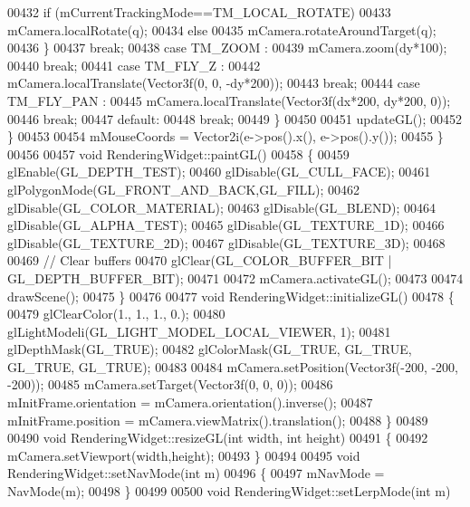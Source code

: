 \begin{DoxyCode}
00432               \textcolor{keywordflow}{if} (mCurrentTrackingMode==TM\_LOCAL\_ROTATE)
00433                 mCamera.localRotate(q);
00434               \textcolor{keywordflow}{else}
00435                 mCamera.rotateAroundTarget(q);
00436             \}
00437             \textcolor{keywordflow}{break};
00438           \textcolor{keywordflow}{case} TM\_ZOOM :
00439             mCamera.zoom(dy*100);
00440             \textcolor{keywordflow}{break};
00441           \textcolor{keywordflow}{case} TM\_FLY\_Z :
00442             mCamera.localTranslate(Vector3f(0, 0, -dy*200));
00443             \textcolor{keywordflow}{break};
00444           \textcolor{keywordflow}{case} TM\_FLY\_PAN :
00445             mCamera.localTranslate(Vector3f(dx*200, dy*200, 0));
00446             \textcolor{keywordflow}{break};
00447           \textcolor{keywordflow}{default}:
00448             \textcolor{keywordflow}{break};
00449         \}
00450 
00451         updateGL();
00452     \}
00453 
00454     mMouseCoords = Vector2i(e->pos().x(), e->pos().y());
00455 \}
00456 
00457 \textcolor{keywordtype}{void} RenderingWidget::paintGL()
00458 \{
00459   glEnable(GL\_DEPTH\_TEST);
00460   glDisable(GL\_CULL\_FACE);
00461   glPolygonMode(GL\_FRONT\_AND\_BACK,GL\_FILL);
00462   glDisable(GL\_COLOR\_MATERIAL);
00463   glDisable(GL\_BLEND);
00464   glDisable(GL\_ALPHA\_TEST);
00465   glDisable(GL\_TEXTURE\_1D);
00466   glDisable(GL\_TEXTURE\_2D);
00467   glDisable(GL\_TEXTURE\_3D);
00468 
00469   \textcolor{comment}{// Clear buffers}
00470   glClear(GL\_COLOR\_BUFFER\_BIT | GL\_DEPTH\_BUFFER\_BIT);
00471 
00472   mCamera.activateGL();
00473 
00474   drawScene();
00475 \}
00476 
00477 \textcolor{keywordtype}{void} RenderingWidget::initializeGL()
00478 \{
00479   glClearColor(1., 1., 1., 0.);
00480   glLightModeli(GL\_LIGHT\_MODEL\_LOCAL\_VIEWER, 1);
00481   glDepthMask(GL\_TRUE);
00482   glColorMask(GL\_TRUE, GL\_TRUE, GL\_TRUE, GL\_TRUE);
00483 
00484   mCamera.setPosition(Vector3f(-200, -200, -200));
00485   mCamera.setTarget(Vector3f(0, 0, 0));
00486   mInitFrame.orientation = mCamera.orientation().inverse();
00487   mInitFrame.position = mCamera.viewMatrix().translation();
00488 \}
00489 
00490 \textcolor{keywordtype}{void} RenderingWidget::resizeGL(\textcolor{keywordtype}{int} width, \textcolor{keywordtype}{int} height)
00491 \{
00492     mCamera.setViewport(width,height);
00493 \}
00494 
00495 \textcolor{keywordtype}{void} RenderingWidget::setNavMode(\textcolor{keywordtype}{int} m)
00496 \{
00497   mNavMode = NavMode(m);
00498 \}
00499 
00500 \textcolor{keywordtype}{void} RenderingWidget::setLerpMode(\textcolor{keywordtype}{int} m)

\end{DoxyCode}
